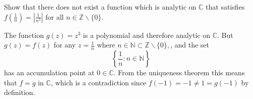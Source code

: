 \documentclass{article}
\newcounter{Problem}
\newenvironment{Problem}{\begin{Exercise}[name={Problem},
                                          counter={Problem}]}
                        {\end{Exercise}}
\begin{document}
\begin{Problem}
  Show that there does not exist a function which is analytic on
  $\mathbb{C}$ that satisfies
  $f\left(\frac{1}{n}\right) = \left|\frac{1}{n^3}\right|$ for all
  $n \in \mathbb{Z} \backslash \{ 0 \}$.
\end{Problem}

\begin{Answer}
  The function $g(z) = z^3$ is a polynomial and therefore analytic
  on $\mathbb{C}$. But $g(z) = f(z)$ for any $z = \frac{1}{n}$ where
  $n \in \mathbb{N} \subset \mathbb{Z} \backslash \{0\},$, and the set
  $$
  \left\{\frac{1}{n} : n \in \mathbb{N} \right\}
  $$
  has an accumulation point at $0 \in \mathbb{C}$. From the uniqueness theorem
  this means that $f = g$ in $\mathbb{C}$, which is a contradiction
  since $f(-1) = -1 \neq 1 = g(-1)$ by definition.
\end{Answer}
\end{document}
